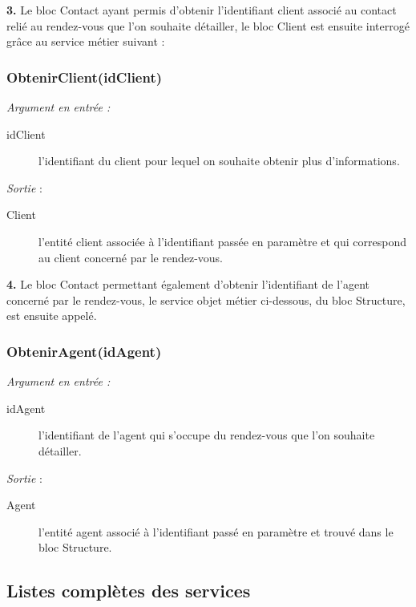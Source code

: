 \begin{shaded}
\textbf{3.} Le bloc Contact ayant permis d'obtenir l'identifiant client associé au contact relié au rendez-vous que l'on souhaite détailler, le bloc Client est ensuite interrogé grâce au service métier suivant :
\end{shaded}

\subsubsection{ObtenirClient(idClient)}

\noindent \textit{Argument en entrée :}
\begin{description}
\item[idClient] l'identifiant du client pour lequel on souhaite obtenir plus d'informations. \\
\end{description}


\noindent \textit{Sortie} :
\begin{description}
\item[Client] l'entité client associée à l'identifiant passée en paramètre et qui correspond au client concerné par le rendez-vous.\\
\end{description}

\begin{shaded}
\textbf{4.} Le bloc Contact permettant également d'obtenir l'identifiant de l'agent concerné par le rendez-vous, le service objet métier ci-dessous, du bloc Structure, est ensuite appelé. 
\end{shaded}


\subsubsection{ObtenirAgent(idAgent)}

\noindent \textit{Argument en entrée :}
\begin{description}
\item[idAgent] l'identifiant de l'agent qui s'occupe du rendez-vous que l'on souhaite détailler. \\
\end{description}

\noindent \textit{Sortie} :
\begin{description}
\item[Agent] l'entité agent associé à l'identifiant passé en paramètre et trouvé dans le bloc Structure. \\
\end{description} 


\restoregeometry
\subsection{Listes complètes des services}

